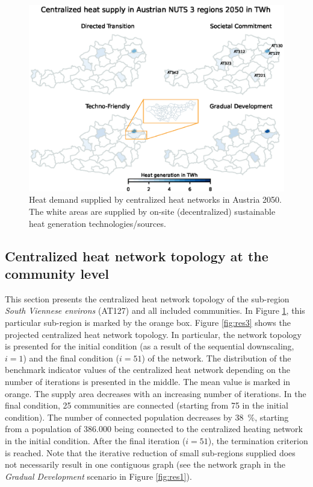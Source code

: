 \begin{figure}
	\centering
	\includegraphics[width=1\linewidth]{figures/4_Results/Heatmap.eps}
	\caption{Heat demand supplied by centralized heat networks in Austria 2050. The white areas are supplied by on-site (decentralized) sustainable heat generation technologies/sources.}
	\label{fig:res2}
\end{figure}

\subsection{Centralized heat network topology at the community level}\label{res:4}
This section presents the centralized heat network topology of the sub-region \textit{South Viennese environs} (AT127) and all included communities. In Figure \ref{fig:res2}, this particular sub-region is marked by the orange box. Figure \ref{fig:res3} shows the projected centralized heat network topology. In particular, the network topology is presented for the initial condition (as a result of the sequential downscaling, $i=1$) and the final condition ($i=51$) of the network. The distribution of the benchmark indicator values of the centralized heat network depending on the number of iterations is presented in the middle. The mean value is marked in orange. The supply area decreases with an increasing number of iterations. In the final condition, 25 communities are connected (starting from 75 in the initial condition). The number of connected population decreases by \SI{38}{\%}, starting from a population of \SI{386,000}{} being connected to the centralized heating network in the initial condition. After the final iteration ($i=51$), the termination criterion is reached. Note that the iterative reduction of small sub-regions supplied does not necessarily result in one contiguous graph (see the network graph in the \textit{Gradual Development} scenario in Figure \ref{fig:res1}).

